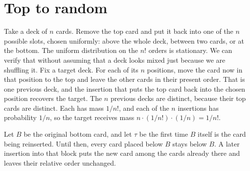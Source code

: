 \section{Top to random}

Take a deck of $n$ cards. Remove the top card and put it back into one of the $n$ possible slots, chosen uniformly: above the whole deck, between two cards, or at the bottom. The uniform distribution on the $n!$ orders is stationary. We can verify that without assuming that a deck looks mixed just because we are shuffling it. Fix a target deck. For each of its $n$ positions, move the card now in that position to the top and leave the other cards in their present order. That is one previous deck, and the insertion that puts the top card back into the chosen position recovers the target. The $n$ previous decks are distinct, because their top cards are distinct. Each has mass $1/n!$, and each of the $n$ insertions has probability $1/n$, so the target receives mass $n\cdot(1/n!)\cdot(1/n)=1/n!$.

Let $B$ be the original bottom card, and let $\tau$ be the first time $B$ itself is the card being reinserted. Until then, every card placed below $B$ stays below $B$. A later insertion into that block puts the new card among the cards already there and leaves their relative order unchanged.

